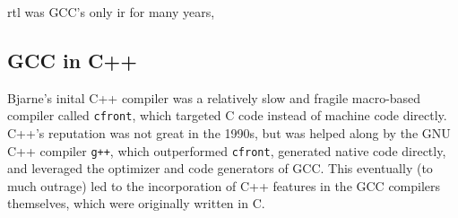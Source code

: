 \acrshort{rtl} was GCC's only \acrshort{ir} for many years,

\subsection{GCC in C++}

Bjarne's inital C++ compiler was a relatively slow and fragile macro-based compiler
called \texttt{cfront}, which targeted C code instead of machine code directly.
C++'s reputation was not great in the 1990s, but was helped along by the GNU
C++ compiler \texttt{g++}, which outperformed \texttt{cfront}, generated native
code directly, and leveraged the optimizer and code generators of GCC.
This eventually (to much outrage) led to the incorporation of C++ features in
the GCC compilers themselves, which were originally written in C.



